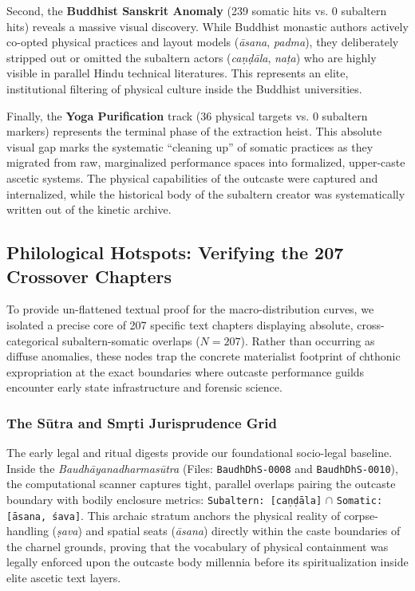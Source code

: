 \documentclass[11pt,twoside,letterpaper]{article}
\begin{document}
Second, the \textbf{Buddhist Sanskrit Anomaly} (239 somatic hits vs. 0 subaltern hits) reveals a massive visual discovery. While Buddhist monastic authors actively co-opted physical practices and layout models (\textit{āsana}, \textit{padma}), they deliberately stripped out or omitted the subaltern actors (\textit{caṇḍāla}, \textit{naṭa}) who are highly visible in parallel Hindu technical literatures. This represents an elite, institutional filtering of physical culture inside the Buddhist universities.

Finally, the \textbf{Yoga Purification} track (36 physical targets vs. 0 subaltern markers) represents the terminal phase of the extraction heist. This absolute visual gap marks the systematic ``cleaning up'' of somatic practices as they migrated from raw, marginalized performance spaces into formalized, upper-caste ascetic systems. The physical capabilities of the outcaste were captured and internalized, while the historical body of the subaltern creator was systematically written out of the kinetic archive.

\subsection{Philological Hotspots: Verifying the 207 Crossover Chapters}
To provide un-flattened textual proof for the macro-distribution curves, we isolated a precise core of 207 specific text chapters displaying absolute, cross-categorical subaltern-somatic overlaps ($N = 207$). Rather than occurring as diffuse anomalies, these nodes trap the concrete materialist footprint of chthonic expropriation at the exact boundaries where outcaste performance guilds encounter early state infrastructure and forensic science.

\subsubsection{The Sūtra and \texorpdfstring{Smṛti}{Smrti} Jurisprudence Grid}The early legal and ritual digests provide our foundational socio-legal baseline. Inside the \textit{Baudhāyanadharmasūtra} (Files: \texttt{BaudhDhS-0008} and \texttt{BaudhDhS-0010}), the computational scanner captures tight, parallel overlaps pairing the outcaste boundary with bodily enclosure metrics: \texttt{Subaltern: [caṇḍāla]} $\cap$ \texttt{Somatic: [āsana, śava]}. This archaic stratum anchors the physical reality of corpse-handling (\textit{ṣava}) and spatial seats (\textit{āsana}) directly within the caste boundaries of the charnel grounds, proving that the vocabulary of physical containment was legally enforced upon the outcaste body millennia before its spiritualization inside elite ascetic text layers.
\end{document}
